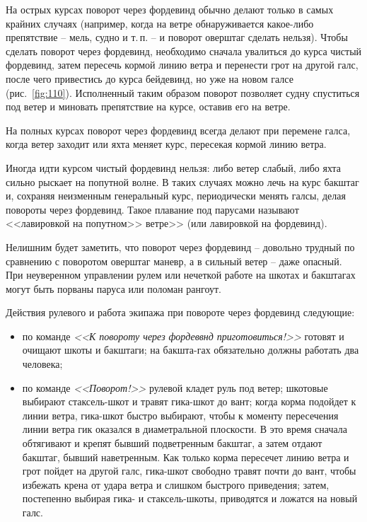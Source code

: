 \documentclass[a4paper, 12pt, twoside, final]{scrbook}
\begin{document}
На острых курсах поворот через фордевинд обычно делают только в самых крайних случаях (например, когда на ветре обнаруживается какое-либо препятствие \--- мель, судно и т.\,п. \--- и поворот оверштаг сделать нельзя). Чтобы сделать поворот через фордевинд, необходимо сначала увалиться до курса чистый фордевинд, затем пересечь кормой линию ветра и перенести грот на другой галс, после чего привестись до курса бейдевинд, но уже на новом галсе (рис.~\ref{fig:110}). Исполненный таким образом поворот позволяет судну спуститься под ветер и миновать препятствие на курсе, оставив его на ветре. 

На полных курсах поворот через фордевинд всегда делают при перемене галса, когда ветер заходит или яхта меняет курс, пересекая кормой линию ветра.

Иногда идти курсом чистый фордевинд нельзя: либо ветер слабый, либо яхта сильно рыскает на попутной волне. В таких случаях можно лечь на курс бакштаг и, сохраняя неизменным генеральный курс, периодически менять галсы, делая повороты через фордевинд. Такое плавание под парусами называют <<лавировкой на попутном>> ветре>> (или лавировкой на фордевинд).

Нелишним будет заметить, что поворот через фордевинд \--- довольно трудный по сравнению с поворотом оверштаг маневр, а в сильный ветер \--- даже опасный. При неуверенном управлении рулем или нечеткой работе на шкотах и бакштагах могут быть порваны паруса или поломан рангоут.

Действия рулевого и работа экипажа при повороте через фордевинд следующие:

\begin{itemize}
\item по команде \textit{<<К повороту через фордеввнд приготовиться!>>} готовят и очищают шкоты и бакштаги; на бакшта-гах обязательно должны работать два человека;
\item по команде \textit{<<Поворот!>>} рулевой кладет руль под ветер; шкотовые выбирают стаксель-шкот и травят гика-шкот до вант; когда корма подойдет к линии ветра, гика-шкот быстро выбирают, чтобы к моменту пересечения линии ветра гик оказался в диаметральной плоскости. В это время сначала обтягивают и крепят бывший подветренным бакштаг, а затем отдают бакштаг, бывший наветренным. Как только корма пересечет линию ветра и грот пойдет на другой галс, гика-шкот свободно травят почти до вант, чтобы избежать крена от удара ветра и слишком быстрого приведения; затем, постепенно выбирая гика- и стаксель-шкоты, приводятся и ложатся на новый галс.
\end{itemize}
\end{document}
